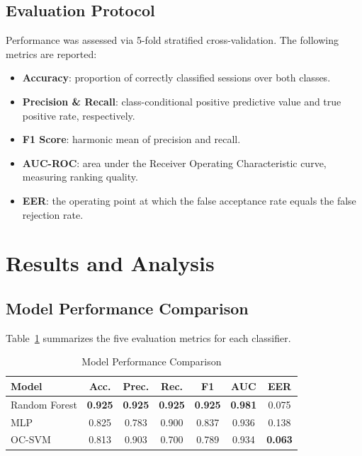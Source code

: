\documentclass[conference]{IEEEtran}
\begin{document}
\subsection{Evaluation Protocol}
Performance was assessed via 5-fold stratified cross-validation. The following metrics are reported:
\begin{itemize}
    \item \textbf{Accuracy}: proportion of correctly classified sessions over both classes.
    \item \textbf{Precision \& Recall}: class-conditional positive predictive value and true positive rate, respectively.
    \item \textbf{F1 Score}: harmonic mean of precision and recall.
    \item \textbf{AUC-ROC}: area under the Receiver Operating Characteristic curve, measuring ranking quality.
    \item \textbf{EER}: the operating point at which the false acceptance rate equals the false rejection rate.
\end{itemize}

\section{Results and Analysis}

\subsection{Model Performance Comparison}

Table~\ref{tab:results} summarizes the five evaluation metrics for each classifier.

\begin{table}[htbp]
\caption{Model Performance Comparison}
\label{tab:results}
\centering
\begin{tabular}{lcccccc}
\toprule
\textbf{Model} & \textbf{Acc.} & \textbf{Prec.} & \textbf{Rec.} & \textbf{F1} & \textbf{AUC} & \textbf{EER} \\
\midrule
Random Forest & \textbf{0.925} & \textbf{0.925} & \textbf{0.925} & \textbf{0.925} & \textbf{0.981} & 0.075 \\
MLP & 0.825 & 0.783 & 0.900 & 0.837 & 0.936 & 0.138 \\
OC-SVM & 0.813 & 0.903 & 0.700 & 0.789 & 0.934 & \textbf{0.063} \\
\bottomrule
\end{tabular}
\end{table}
\end{document}
